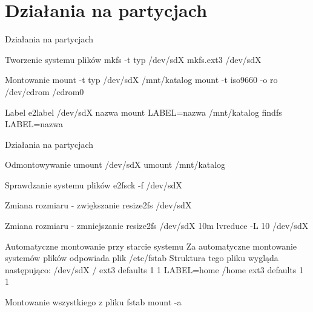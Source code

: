 \documentclass[xcolor=dvipsnames]{beamer}
\begin{document}
\section{Działania na partycjach}
\begin{frame}{Działania na partycjach}
\begin{block}{Tworzenie systemu plików}
mkfs -t typ /dev/sdX
\newline
mkfs.ext3 /dev/sdX
\end{block}
\pause
\begin{block}{Montowanie}
mount -t typ /dev/sdX /mnt/katalog
\newline
mount -t iso9660 -o ro /dev/cdrom /cdrom0
\end{block}
\pause
\begin{block}{Label}
e2label /dev/sdX nazwa
\newline
mount LABEL=nazwa /mnt/katalog
\newline
findfs LABEL=nazwa
\end{block}
\end{frame}
\begin{frame}{Działania na partycjach}
\begin{block}{Odmontowywanie}
umount /dev/sdX
\newline
umount /mnt/katalog
\end{block}
\pause
\begin{block}{Sprawdzanie systemu plików}
e2fsck -f /dev/sdX
\end{block}
\pause
\begin{block}{Zmiana rozmiaru - zwiększanie}
resize2fs /dev/sdX
\end{block}
\pause
\begin{block}{Zmiana rozmiaru - zmniejszanie}
resize2fs /dev/sdX 10m
\newline
lvreduce -L 10 /dev/sdX
\end{block}
\end{frame}
\begin{frame}{Automatyczne montowanie przy starcie systemu}
Za automatyczne montowanie systemów plików odpowiada plik /etc/fstab
\newline
Struktura tego pliku wygląda następująco:
\newline
/dev/sdX	/	ext3	defaults 1 1
\newline
LABEL=home	/home	ext3	defaults 1 1
\newline
\pause
\begin{block}{Montowanie wszystkiego z pliku fstab}
mount -a
\end{block}
\end{frame}
\end{document}
